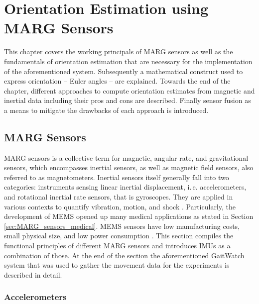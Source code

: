 \chapter{Orientation Estimation using MARG Sensors}
\label{ch:orientation_estimation}

This chapter covers the working principals of MARG sensors as well as the fundamentals of orientation estimation that are necessary for the implementation of the aforementioned system. Subsequently a mathematical construct used to express orientation -- Euler angles -- are explained. Towards the end of the chapter, different approaches to compute orientation estimates from magnetic and inertial data including their pros and cons are described. Finally sensor fusion as a means to mitigate the drawbacks of each approach is introduced.

\section{MARG Sensors}

MARG sensors is a collective term for magnetic, angular rate, and gravitational sensors, which encompasses inertial sensors, as well as magnetic field sensors, also referred to as magnetometers. Inertial sensors itself generally fall into two categories: instruments sensing linear inertial displacement, i.\,e. accelerometers, and rotational inertial rate sensors, that is gyroscopes. They are applied in various contexts to quantify vibration, motion, and shock \cite{bhattacharyya_inertial_sensors_applications_13}. Particularly, the development of \gls{MEMS} opened up many medical applications as stated in Section \ref{sec:MARG_sensors_medical}. MEMS sensors have low manufacturing costs, small physical size, and low power consumption \cite{bhattacharyya_inertial_sensors_applications_13}. This section compiles the functional principles of different MARG sensors and introduces \glspl{IMU} as a combination of those. At the end of the section the aforementioned GaitWatch system that was used to gather the movement data for the experiments is described in detail.

\subsection{Accelerometers}

